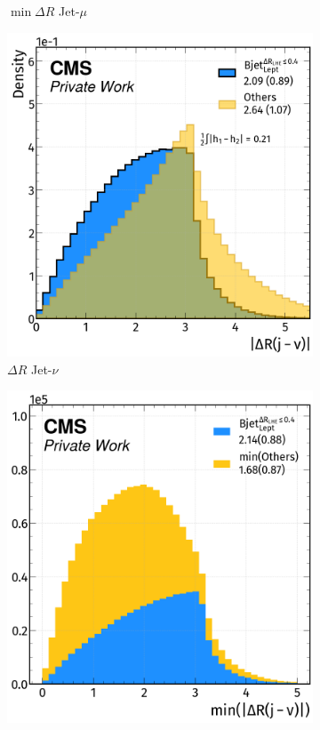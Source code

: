 \begin{figure}[H]
\begin{subfigure}{0.4585\linewidth}
        \caption{$\min \Delta R$ Jet-$\mu$}
    \end{subfigure}  
    \hfill
    \begin{subfigure}{0.49\linewidth}
        \centering
        \includegraphics[width=1\linewidth]{fig//chap08-kin_reco/dr_nu.png}
        \caption{$\Delta R$ Jet-$\nu$}
    \end{subfigure}
    \hfill
    \begin{subfigure}{0.4775\linewidth}  
        \centering
        \includegraphics[width=1\linewidth]{fig//chap08-kin_reco/min_dr_nu.png}

\end{subfigure}
\end{figure}
